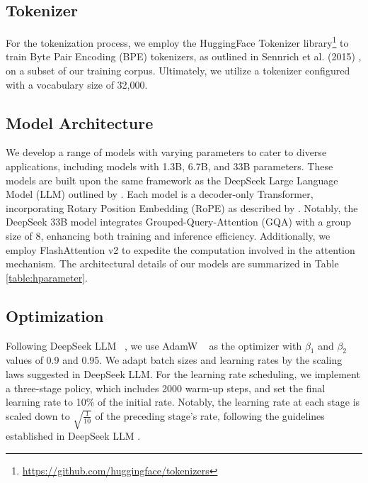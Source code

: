 \subsection{Tokenizer}

For the tokenization process, we employ the HuggingFace Tokenizer library\footnote{\url{https://github.com/huggingface/tokenizers}} to train Byte Pair Encoding (BPE) tokenizers, as outlined in Sennrich et al. (2015) \citep{sennrich2015neural}, on a subset of our training corpus. Ultimately, we utilize a tokenizer configured with a vocabulary size of 32,000.
\subsection{Model Architecture}

We develop a range of models with varying parameters to cater to diverse applications, including models with 1.3B, 6.7B, and 33B parameters. These models are built upon the same framework as the DeepSeek Large Language Model (LLM) outlined by \cite{bi2024deepseek}. Each model is a decoder-only Transformer, incorporating Rotary Position Embedding (RoPE) as described by \cite{su2023roformer}. Notably, the DeepSeek 33B model integrates Grouped-Query-Attention (GQA) with a group size of 8, enhancing both training and inference efficiency. Additionally, we employ FlashAttention v2 \citep{dao2023flashattention2} to expedite the computation involved in the attention mechanism. The architectural details of our models are summarized in Table \ref{table:hparameter}. 

\subsection{Optimization}
Following DeepSeek LLM ~\citep{bi2024deepseek}, we use AdamW ~\citep{loshchilov2019decoupled} as the optimizer with $\beta_1$ and $\beta_2$ values of 0.9 and 0.95. We adapt batch sizes and learning rates by the scaling laws suggested in DeepSeek LLM. For the learning rate scheduling, we implement a three-stage policy, which includes 2000 warm-up steps, and set the final learning rate to 10\% of the initial rate. Notably, the learning rate at each stage is scaled down to $\sqrt{\frac{1}{10}}$ of the preceding stage's rate, following the guidelines established in DeepSeek LLM  \citep{bi2024deepseek}.

